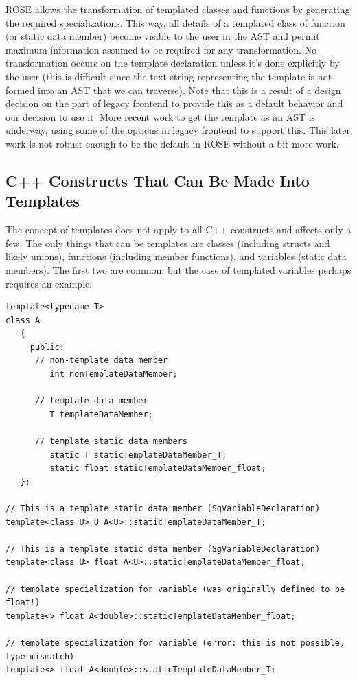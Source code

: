    ROSE allows the transformation of templated classes and
functions by generating the required specializations.  This way, all details of 
a templated class of function (or static data member) become visible to the user in
the AST and permit maximum information assumed to be required for any transformation.
No transformation occurs on the template declaration unless it's done explicitly by 
the user (this is difficult since the text string representing the template is not
formed into an AST that we can traverse).  Note that this is a result of a design
decision on the part of legacy frontend to provide this as a default behavior and our decision 
to use it.  More recent work to get the template as an AST is underway, using some 
of the options in legacy frontend to support this.  This later work is not robust enough to be 
the default in ROSE without a bit more work.

\subsection{C++ Constructs That Can Be Made Into Templates}
   The concept of templates does not apply to all C++ constructs and affects only a few.
The only things that can be templates are classes (including structs and likely unions),
functions (including member functions), and variables (static data
members).  The first two are common, but the case of templated variables perhaps requires 
an example:

{\indent
{\mySmallFontSize

\begin{verbatim}
template<typename T>
class A
   {
     public:
      // non-template data member
         int nonTemplateDataMember;

      // template data member
         T templateDataMember;

      // template static data members
         static T staticTemplateDataMember_T;
         static float staticTemplateDataMember_float;
   };
         
// This is a template static data member (SgVariableDeclaration)
template<class U> U A<U>::staticTemplateDataMember_T;

// This is a template static data member (SgVariableDeclaration)
template<class U> float A<U>::staticTemplateDataMember_float;

// template specialization for variable (was originally defined to be float!)
template<> float A<double>::staticTemplateDataMember_float;

// template specialization for variable (error: this is not possible, type mismatch)
template<> float A<double>::staticTemplateDataMember_T;
\end{verbatim}
}}

